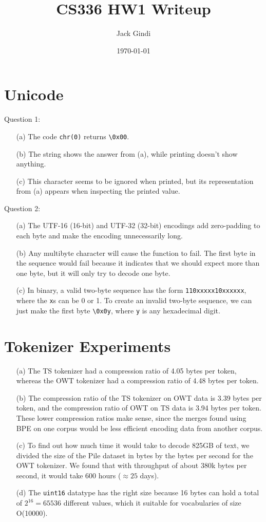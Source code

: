 \documentclass[11pt]{article}
\title{CS336 HW1 Writeup}
\author{Jack Gindi}
\date{\today}
\begin{document}
\maketitle

\section*{Unicode}
Question 1:
\begin{enumerate}
    \item[(a)] The code \texttt{chr(0)} returns \texttt{\textbackslash 0x00}.
    \item[(b)] The string shows the answer from (a), while printing doesn't show anything.
    \item[(c)] This character seems to be ignored when printed, but its representation from (a) appears when inspecting the printed value.
\end{enumerate}

\noindent Question 2:
\begin{enumerate}
    \item[(a)] The UTF-16 (16-bit) and UTF-32 (32-bit) encodings add zero-padding to each byte and make the encoding unnecessarily long.
    \item[(b)] Any multibyte character will cause the function to fail. The first byte in the sequence would fail because it indicates that we should expect more than one byte, but it will only try to decode one byte.
    \item[(c)] In binary, a valid two-byte sequence has the form \texttt{110xxxxx10xxxxxx}, where the \texttt{x}s can be 0 or 1. To create an invalid two-byte sequence, we can just make the first byte \texttt{\textbackslash 0x0y}, where \texttt{y} is any hexadecimal digit.
\end{enumerate}

\section*{Tokenizer Experiments}
\begin{enumerate}
    \item[(a)] The TS tokenizer had a compression ratio of 4.05 bytes per token, whereas the OWT tokenizer had a compression ratio of 4.48 bytes per token.
    \item[(b)] The compression ratio of the TS tokenizer on OWT data is 3.39 bytes per token, and the compression ratio of OWT on TS data is 3.94 bytes per token. These lower compression ratios make sense, since the merges found using BPE on one corpus would be less efficient encoding data from another corpus.
    \item[(c)] To find out how much time it would take to decode 825GB of text, we divided the size of the Pile dataset in bytes by the bytes per second for the OWT tokenizer. We found that with throughput of about 380k bytes per second, it would take 600 hours ($\approx 25$ days).
    \item[(d)] The \texttt{uint16} datatype has the right size because 16 bytes can hold a total of $2^{16} = 65536$ different values, which it suitable for vocabularies of size O(10000).
\end{enumerate}
\end{document}
